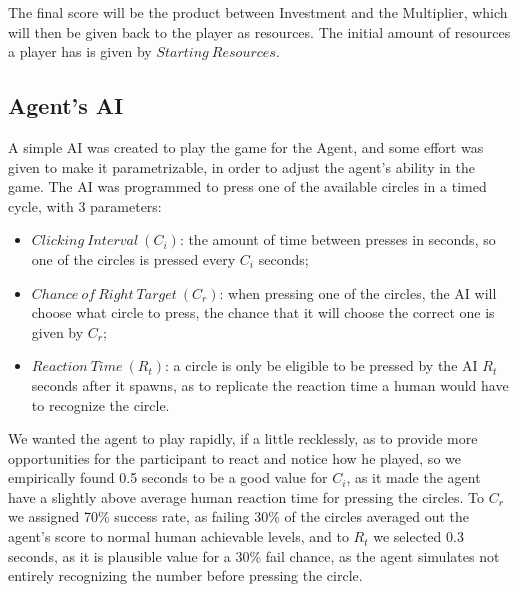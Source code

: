 The final score will be the product between Investment and the Multiplier, which will then be given back to the player as resources. The initial amount of resources a player has is given by $Starting\ Resources$.


\subsection{Agent's \ac{AI}}
A simple \ac{AI} was created to play the game for the Agent, and some effort was given to make it parametrizable, in order to adjust the agent's ability in the game. The \ac{AI} was programmed to press one of the available circles in a timed cycle, with 3 parameters:
\begin{itemize}
    \item $Clicking\ Interval\ (C_i)$: the amount of time between presses in seconds, so one of the circles is pressed every $C_i$ seconds;
    \item $Chance\ of\ Right\ Target\ (C_r)$: when pressing one of the circles, the \ac{AI} will choose what circle to press, the chance that it will choose the correct one is given by $C_r$;
    \item $Reaction\ Time\ (R_t)$: a circle is only be eligible to be pressed by the \ac{AI} $R_t$ seconds after it spawns, as to replicate the reaction time a human would have to recognize the circle.
\end{itemize}

We wanted the agent to play rapidly, if a little recklessly, as to provide more opportunities for the participant to react and notice how he played, so we empirically found 0.5 seconds to be a good value for $C_i$, as it made the agent have a slightly above average human reaction time for pressing the circles. To $C_r$ we assigned 70\% success rate, as failing 30\% of the circles averaged out the agent's score to normal human achievable levels, and to $R_t$ we selected 0.3 seconds, as it is plausible value for a 30\% fail chance, as the agent simulates not entirely recognizing the number before pressing the circle.

